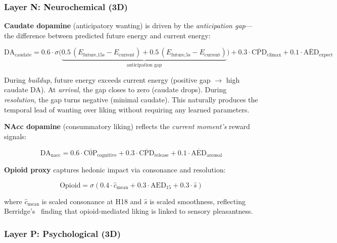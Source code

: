 \documentclass[10pt,twocolumn]{article}
\newcommand{\sigmoid}{\sigma}
\begin{document}
\subsubsection{Layer N: Neurochemical (3D)}

\textbf{Caudate dopamine} (anticipatory wanting) is driven by the \textit{anticipation gap}---the difference between predicted future energy and current energy:

\begin{equation}
\text{DA}_\text{caudate} = 0.6 \cdot \sigmoid\!\Big(\underbrace{0.5\,(E_\text{future,15s} - E_\text{current}) + 0.5\,(E_\text{future,5s} - E_\text{current})}_{\text{anticipation gap}}\Big) + 0.3 \cdot \overline{\text{CPD}}_\text{climax} + 0.1 \cdot \overline{\text{AED}}_\text{expect}
\label{eq:da_caudate}
\end{equation}

During \textit{buildup}, future energy exceeds current energy (positive gap $\to$ high caudate DA). At \textit{arrival}, the gap closes to zero (caudate drops). During \textit{resolution}, the gap turns negative (minimal caudate). This naturally produces the temporal lead of wanting over liking without requiring any learned parameters.

\textbf{NAcc dopamine} (consummatory liking) reflects the \textit{current moment's} reward signals:

\begin{equation}
\text{DA}_\text{nacc} = 0.6 \cdot \overline{\text{C0P}}_\text{cognitive} + 0.3 \cdot \overline{\text{CPD}}_\text{release} + 0.1 \cdot \overline{\text{AED}}_\text{arousal}
\label{eq:da_nacc}
\end{equation}

\textbf{Opioid proxy} captures hedonic impact via consonance and resolution:

\begin{equation}
\text{Opioid} = \sigmoid\!\left(0.4 \cdot \hat{c}_\text{mean} + 0.3 \cdot \text{AED}_{15} + 0.3 \cdot \hat{s}\right)
\label{eq:opioid}
\end{equation}

\noindent where $\hat{c}_\text{mean}$ is scaled consonance at H18 and $\hat{s}$ is scaled smoothness, reflecting Berridge's~\cite{Berridge2003} finding that opioid-mediated liking is linked to sensory pleasantness.

\subsubsection{Layer P: Psychological (3D)}
\end{document}

